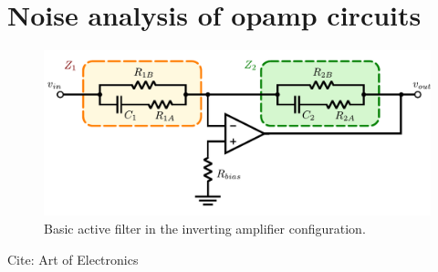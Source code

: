 \section{Noise analysis of opamp circuits}

\begin{figure}
\includegraphics[width=\columnwidth]{notes/figures/inverting-amp.pdf}
\caption{\label{fig:inverting-amp}Basic active filter in the inverting amplifier configuration.} 
\end{figure}

Cite: Art of Electronics
